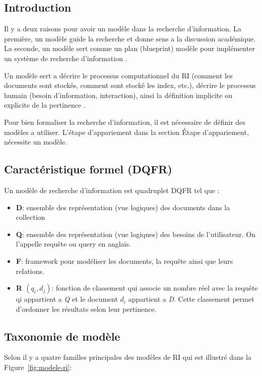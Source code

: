 \subsection{Introduction}
Il y a deux raisons pour avoir un modèle dans la recherche d'information. La première, un modèle guide la recherche et donne sens a la discussion académique. La seconde, un modèle sert comme un plan (blueprint) modèle pour implémenter un système de recherche d'information \citep{model-ir}.

Un modèle sert a décrire le processus computationnel du RI (comment les documents sont stockés, comment sont stocké les index, etc.), décrire le processus humain (besoin d'information, interaction), ainsi la définition implicite ou explicite de la pertinence \citep{model-ri-cours}.

Pour bien formaliser la recherche d'information, il est nécessaire de définir des modèles a utiliser. L'étape d’appariement dans la section Étape d'appariement, nécessite un modèle.

\subsection{Caractéristique formel (DQFR)}
\begin{definition}
    Un modèle de recherche d'information est quadruplet DQFR tel que \citep*{modern-ir, vsm}:
    \begin{itemize}
        \item \textbf{D}: ensemble des représentation (vue logiques) des documents dans la collection
        \item \textbf{Q}: ensemble des représentation (vue logiques) des besoins de l'utilisateur. On l'appelle requête ou query en anglais.
        \item \textbf{F}: framework pour modéliser les documents, la requête ainsi que leurs relations.
        \item \textbf{R $(q_{i}, d_{j})$}: fonction de classement qui associe un nombre réel avec la requête qi appartient a \textit{Q} et le document $d_{i}$ appartient a \textit{D}. Cette classement permet d'ordonner les résultats selon leur pertinence.
    \end{itemize}
\end{definition}

\subsection{Taxonomie de modèle}
Selon \citeauthor{modern-ir} il y a quatre familles principales des modèles de RI qui est illustré dans la Figure~\ref{fig:modele-ri}:

